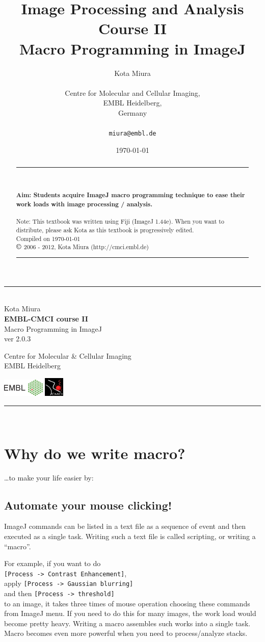 \documentclass[11pt,a4paper,oneside]{report}
\newcommand{\ijmenu}[1]{\texttt{\small#1}}
\newcommand{\HRule}{\rule{\linewidth}{0.5mm}}
\newcommand*{\titleTH}{\begingroup%
\raggedleft
\HRule\\
\vspace*{\baselineskip}
{\Large Kota Miura}\\[0.167\textheight]

{\bfseries EMBL-CMCI course II}\\[\baselineskip]
{\textcolor{Medium}{\Huge Macro Programming in ImageJ}}\\[\baselineskip]
{\small ver 2.0.3}\par
\vfill

{\Large Centre for Molecular \& Cellular Imaging\\EMBL Heidelberg}\par
\includegraphics[width=0.15\textwidth]{fig/rgb_logo_2006_win.eps} 
\includegraphics[width=0.07\textwidth]{fig/Icon30pedge.jpg}\\[1cm] 
\vspace*{3\baselineskip}
\HRule\\
\endgroup}
\begin{document}
\title{Image Processing and Analysis Course II\\
Macro Programming in ImageJ}
\author{Kota Miura\\
\\
  Centre for Molecular and Cellular Imaging,\\
  EMBL Heidelberg,\\
  Germany\\
\\
\texttt{miura@embl.de}
}

\date{\today}

\pagestyle{empty}
\titleTH
\clearpage
\pagestyle{fancyplain}
\begin{abstract}
\HRule
\\
\\
\textbf{Aim: Students acquire ImageJ macro programming technique 
to ease their work loads with image processing / analysis.}
\\
\\
Note: This textbook was written using Fiji (ImageJ 1.44e). 
When you want to distribute, please ask Kota as this textbook is progressively edited.
\\
Compiled on \today \\
$\copyright$ 2006 - 2012, Kota Miura (http://cmci.embl.de)
\\
\HRule
\end{abstract}

\begingroup
\hypersetup{linkcolor=black}
\tableofcontents
\endgroup

\clearpage
\setcounter{chapter}{2}
\section{Why do we write macro?}

\dots to make your life easier by:

\subsection{Automate your mouse clicking!}

ImageJ commands can be listed in a text file as a sequence of event and then executed as a single task. 
Writing such a text file is called scripting, or writing a ``macro''. 

For example, if you want to do \\
\ijmenu{[Process -> Contrast Enhancement]}, \\
apply \ijmenu{[Process -> Gaussian blurring]} \\
and then \ijmenu{[Process -> threshold]} \\
to an image, it takes three times of mouse operation choosing these commands from ImageJ menu. 
If you need to do this for many images, the work load would become pretty heavy. 
Writing a macro assembles such works into a single task. Macro becomes even more powerful 
when you need to process/analyze stacks. 
\end{document}
